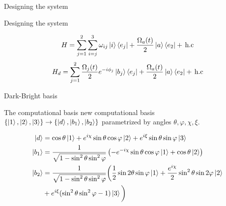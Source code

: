 \documentclass[t]{beamer}
\begin{document}
\begin{frame}{Designing the system}

\end{frame}


\begin{frame}{Designing the system}



\begin{equation}
H = \sum_{j = 1}^2 \sum_{i =j}^{3} \omega_{ij}\ket{i}\bra{e_j}  + \frac{\Omega_{a}(t)}{2}\ket{a}\bra{e_2}  +\,\text{h.c} 
\end{equation}
\begin{equation}
 H_d = \sum_{j = 1}^2 \frac{\Omega_j(t)}{2}e^{-i\phi_j}\ket{b_j}\bra{e_j}  + \frac{\Omega_a(t)}{2}\ket{a}\bra{e_2}  +\,\text{h.c}
\end{equation}

\end{frame}

\begin{frame}{Dark-Bright basis}

The computational basis new computational basis $\{\ket{1},\ket{2},\ket{3}\} \rightarrow \{\ket{d},\ket{b_1},\ket{b_2}\}$ 
parametrized by angles $\theta,\varphi,\chi,\xi$.


\begin{equation}
\begin{aligned}
\ket{d} &= \cos\theta\ket{1} + e^{i\chi}\sin\theta\cos\varphi\ket{2} + e^{i\xi}\sin\theta\sin\varphi\ket{3}
\\
\ket{b_1} &= \frac{1}{\sqrt{1-\sin^2\theta\sin^2\varphi}} \left(-e^{-i\chi}\sin\theta\cos\varphi\ket{1} + \cos\theta\ket{2} \right)
\\
\ket{b_2} &= \frac{1}{\sqrt{1-\sin^2\theta\sin^2\varphi}} \bigg(\frac{1}{2}\sin 2\theta\sin\varphi\ket{1} + \dfrac{e^{i\chi}}{2}\sin^2\theta\sin 2\varphi\ket{2} \\&+ e^{i\xi}(\sin^2\theta\sin^2\varphi - 1)\ket{3}\bigg)
\end{aligned}
\end{equation}

\end{frame}
\end{document}
